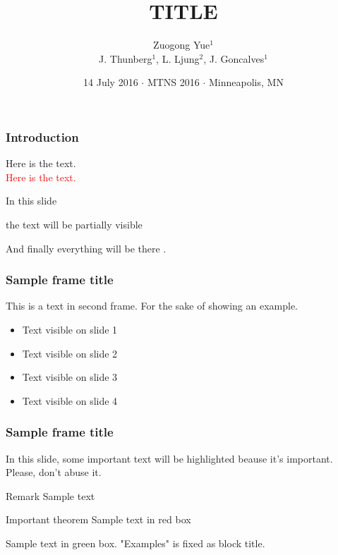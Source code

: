 \documentclass[xcolor={dvipsnames}]{beamer}
\title[]{TITLE}
\subtitle{}
\author{\small Zuogong Yue$^1$\\[1ex] J. Thunberg$^1$, L. Ljung$^2$, J. Goncalves$^1$}
\institute[]{
    \begin{tabular}{ll}
      $^1$ Universit\'{e} du Luxembourg, Luxembourg\\
      $^2$ Link\"{o}ping University, Sweden
    \end{tabular}}
\date{\footnotesize 14 July 2016 $\cdot$ MTNS 2016 $\cdot$ Minneapolis, MN}
\begin{document}
\createLCSBTitlePage


\begin{frame}
  \frametitle{Introduction}

  \huge
  Here is the text.\\
  \textcolor{red}{Here is the text.}

\end{frame}



\begin{frame}
  In this slide \pause

  the text will be partially visible \pause

  And finally everything will be there \cite{Yue2017}.
\end{frame}



\begin{frame}
  \frametitle{Sample frame title}
  This is a text in second frame.
  For the sake of showing an example.

  \begin{itemize}
  \item<1-> Text visible on slide 1
  \item<2-> Text visible on slide 2
  \item<3> Text visible on slide 3
  \item<4-> Text visible on slide 4
  \end{itemize}
\end{frame}



\begin{frame}
  \frametitle{Sample frame title}

  In this slide, some important text will be
  \alert{highlighted} beause it's important.
  Please, don't abuse it.

  \begin{block}{Remark}
    Sample text
  \end{block}

  \begin{alertblock}{Important theorem}
    Sample text in red box
  \end{alertblock}

  \begin{examples}
    Sample text in green box. "Examples" is fixed as block title.
  \end{examples}
\end{frame}
\end{document}
